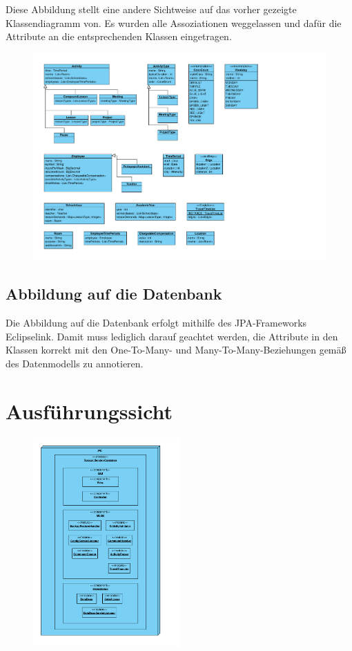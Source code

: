 \documentclass[fontsize=12pt,paper=a4,twoside]{scrartcl}
\begin{document}
Diese Abbildung stellt eine andere Sichtweise auf das vorher gezeigte Klassendiagramm von. Es wurden alle Assoziationen weggelassen und dafür die Attribute an die entsprechenden Klassen eingetragen.
\begin{figure}[H]
\includegraphics[width=\textwidth]{Datensicht.pdf}
\end{figure}


\subsection{Abbildung auf die Datenbank}
Die Abbildung auf die Datenbank erfolgt mithilfe des JPA-Frameworks Eclipselink. Damit muss lediglich darauf geachtet werden, die Attribute in den Klassen korrekt mit den One-To-Many- und Many-To-Many-Beziehungen gemäß des Datenmodells zu annotieren.\\

\clearpage


\section{Ausführungssicht}
\label{sec:ausfuehrung}

\begin{figure}[H]
\centering
\includegraphics[width=0.5\textwidth]{ausfuehrung.pdf}
\end{figure}
\end{document}
